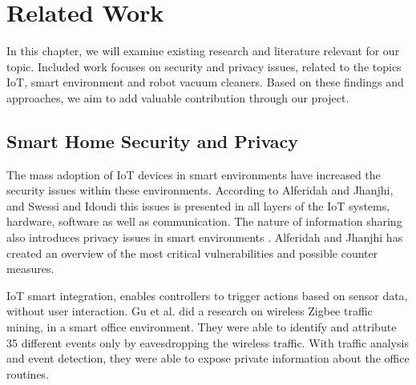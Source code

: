 \chapter{Related Work}
In this chapter, we will examine existing research and literature relevant for our topic. Included work focuses on security and privacy issues, related to the topics IoT, smart environment and robot vacuum cleaners. Based on these findings and approaches, we aim to add valuable contribution through our project. 


\section{Smart Home Security and Privacy}
The mass adoption of IoT devices in smart environments have increased the security issues within these environments. According to Alferidah and Jhanjhi\cite{Iotissues}, and Swessi and  Idoudi \cite{iotissues1} this issues is presented in all layers of the IoT systems, hardware, software as well as communication. The nature of information sharing also introduces privacy issues in smart environments \cite{Iotissues}. Alferidah and Jhanjhi \cite{Iotissues} has created an overview of the most critical vulnerabilities and possible counter measures. 

IoT smart integration, enables controllers to trigger actions based on sensor data, without user interaction. Gu et al. \cite{eavsIoT} did a research on wireless Zigbee traffic mining, in a smart office environment. They were able to identify and attribute 35 different events only by eavesdropping the wireless traffic. With traffic analysis and event detection, they were able to expose private information about the office routines.  

